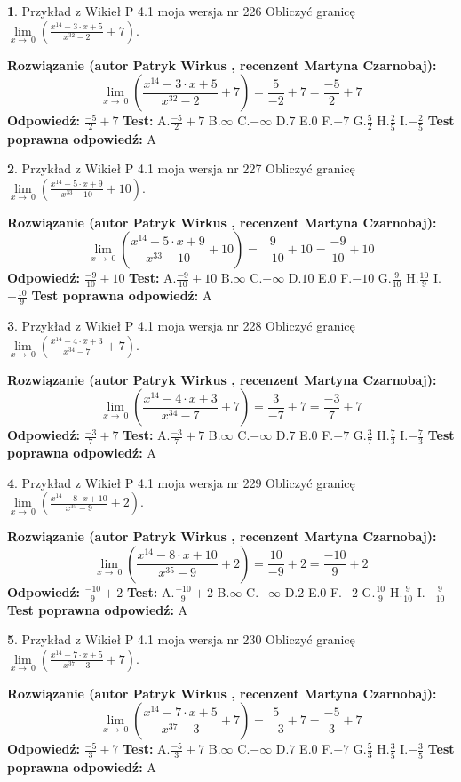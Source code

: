 \documentclass[12pt, a4paper]{article}
\theoremstyle{definition} %
\newtheorem{zad}{}
\newcommand{\zadStart}[1]{\begin{zad}#1\newline}
\newcommand{\zadStop}{\end{zad}}
\newcommand{\rozwStart}[2]{\noindent \textbf{Rozwiązanie (autor #1 , recenzent #2): }\newline}
\newcommand{\rozwStop}{\newline}
\newcommand{\odpStart}{\noindent \textbf{Odpowiedź:}\newline}
\newcommand{\odpStop}{\newline}
\newcommand{\testStart}{\noindent \textbf{Test:}\newline}
\newcommand{\testStop}{\newline}
\newcommand{\kluczStart}{\noindent \textbf{Test poprawna odpowiedź:}\newline}
\newcommand{\kluczStop}{\newline}
\begin{document}
\zadStart{Przykład z Wikieł P 4.1 moja wersja nr 226}
Obliczyć granicę $\lim\limits_{x\to\ 0}(\frac{x^{14}-3 \cdot x +5}{x^{32}-2}+7)$.
\zadStop
\rozwStart{Patryk Wirkus}{Martyna Czarnobaj}
$$\lim\limits_{x\to\ 0}(\frac{x^{14}-3 \cdot x +5}{x^{32}-2}+7)=\frac{5}{-2}+7=\frac{-5}{2}+7$$
\rozwStop
\odpStart
$\frac{-5}{2}+7$
\odpStop
\testStart
A.$\frac{-5}{2}+7$
B.$\infty$
C.$-\infty$
D.$7$
E.$0$
F.$-7$
G.$\frac{5}{2}$
H.$\frac{2}{5}$
I.$-\frac{2}{5}$
\testStop
\kluczStart
A
\kluczStop



\zadStart{Przykład z Wikieł P 4.1 moja wersja nr 227}
Obliczyć granicę $\lim\limits_{x\to\ 0}(\frac{x^{14}-5 \cdot x +9}{x^{33}-10}+10)$.
\zadStop
\rozwStart{Patryk Wirkus}{Martyna Czarnobaj}
$$\lim\limits_{x\to\ 0}(\frac{x^{14}-5 \cdot x +9}{x^{33}-10}+10)=\frac{9}{-10}+10=\frac{-9}{10}+10$$
\rozwStop
\odpStart
$\frac{-9}{10}+10$
\odpStop
\testStart
A.$\frac{-9}{10}+10$
B.$\infty$
C.$-\infty$
D.$10$
E.$0$
F.$-10$
G.$\frac{9}{10}$
H.$\frac{10}{9}$
I.$-\frac{10}{9}$
\testStop
\kluczStart
A
\kluczStop



\zadStart{Przykład z Wikieł P 4.1 moja wersja nr 228}
Obliczyć granicę $\lim\limits_{x\to\ 0}(\frac{x^{14}-4 \cdot x +3}{x^{34}-7}+7)$.
\zadStop
\rozwStart{Patryk Wirkus}{Martyna Czarnobaj}
$$\lim\limits_{x\to\ 0}(\frac{x^{14}-4 \cdot x +3}{x^{34}-7}+7)=\frac{3}{-7}+7=\frac{-3}{7}+7$$
\rozwStop
\odpStart
$\frac{-3}{7}+7$
\odpStop
\testStart
A.$\frac{-3}{7}+7$
B.$\infty$
C.$-\infty$
D.$7$
E.$0$
F.$-7$
G.$\frac{3}{7}$
H.$\frac{7}{3}$
I.$-\frac{7}{3}$
\testStop
\kluczStart
A
\kluczStop



\zadStart{Przykład z Wikieł P 4.1 moja wersja nr 229}
Obliczyć granicę $\lim\limits_{x\to\ 0}(\frac{x^{14}-8 \cdot x +10}{x^{35}-9}+2)$.
\zadStop
\rozwStart{Patryk Wirkus}{Martyna Czarnobaj}
$$\lim\limits_{x\to\ 0}(\frac{x^{14}-8 \cdot x +10}{x^{35}-9}+2)=\frac{10}{-9}+2=\frac{-10}{9}+2$$
\rozwStop
\odpStart
$\frac{-10}{9}+2$
\odpStop
\testStart
A.$\frac{-10}{9}+2$
B.$\infty$
C.$-\infty$
D.$2$
E.$0$
F.$-2$
G.$\frac{10}{9}$
H.$\frac{9}{10}$
I.$-\frac{9}{10}$
\testStop
\kluczStart
A
\kluczStop



\zadStart{Przykład z Wikieł P 4.1 moja wersja nr 230}
Obliczyć granicę $\lim\limits_{x\to\ 0}(\frac{x^{14}-7 \cdot x +5}{x^{37}-3}+7)$.
\zadStop
\rozwStart{Patryk Wirkus}{Martyna Czarnobaj}
$$\lim\limits_{x\to\ 0}(\frac{x^{14}-7 \cdot x +5}{x^{37}-3}+7)=\frac{5}{-3}+7=\frac{-5}{3}+7$$
\rozwStop
\odpStart
$\frac{-5}{3}+7$
\odpStop
\testStart
A.$\frac{-5}{3}+7$
B.$\infty$
C.$-\infty$
D.$7$
E.$0$
F.$-7$
G.$\frac{5}{3}$
H.$\frac{3}{5}$
I.$-\frac{3}{5}$
\testStop
\kluczStart
A
\kluczStop
\end{document}

